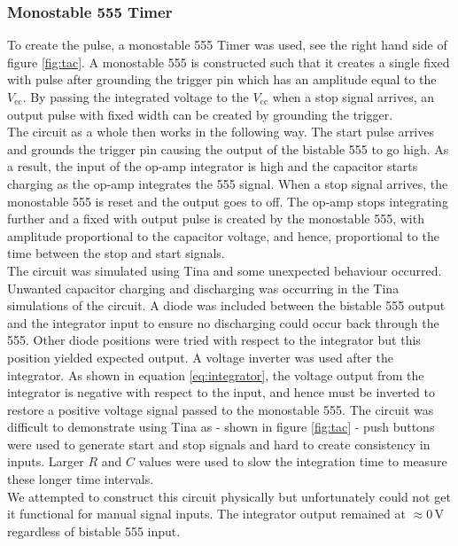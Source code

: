 \documentclass[%
 reprint,
 amsmath,amssymb,
 aps,
]{revtex4-2}
\begin{document}
        \subsubsection{Monostable 555 Timer}
        To create the pulse, a monostable 555 Timer was used, see the right hand side of figure \ref{fig:tac}. A monostable 555 is constructed such that it creates a single fixed with pulse after grounding the trigger pin which has an amplitude equal to the $V_\text{cc}$. By passing the integrated voltage to the $V_\text{cc}$ when a stop signal arrives, an output pulse with fixed width can be created by grounding the trigger.\\

        The circuit as a whole then works in the following way. The start pulse arrives and grounds the trigger pin causing the output of the bistable 555 to go high. As a result, the input of the op-amp integrator is high and the capacitor starts charging as the op-amp integrates the 555 signal. When a stop signal arrives, the monostable 555 is reset and the output goes to off. The op-amp stops integrating further and a fixed with output pulse is created by the monostable 555, with amplitude proportional to the capacitor voltage, and hence, proportional to the time between the stop and start signals.\\ 

        The circuit was simulated using Tina and some unexpected behaviour occurred. Unwanted capacitor charging and discharging was occurring in the Tina simulations of the circuit. A diode was included between the bistable 555 output and the integrator input to ensure no discharging could occur back through the 555. Other diode positions were tried with respect to the integrator but this position yielded expected output. A voltage inverter was used after the integrator. As shown in equation \ref{eq:integrator}, the voltage output from the integrator is negative with respect to the input, and hence must be inverted to restore a positive voltage signal passed to the monostable 555. The circuit was difficult to demonstrate using Tina as - shown in figure \ref{fig:tac} - push buttons were used to generate start and stop signals and hard to create consistency in inputs. Larger $R$ and $C$ values were used to slow the integration time to measure these longer time intervals.\\

        We attempted to construct this circuit physically but unfortunately could not get it functional for manual signal inputs. The integrator output remained at $\approx0\,\text{V}$ regardless of bistable 555 input.
\end{document}
